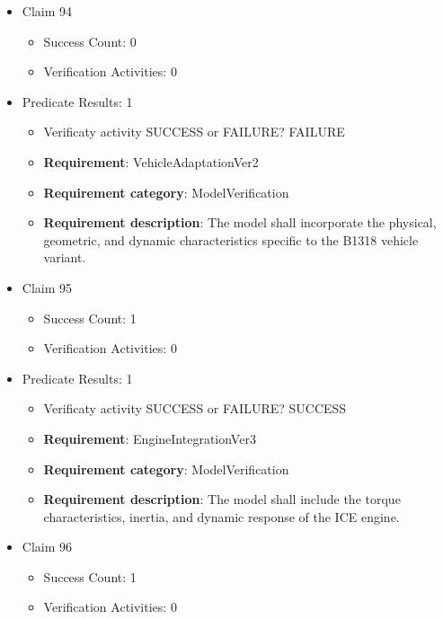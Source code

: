 \documentclass{article}
\begin{document}
\begin{itemize}
  				  \item Claim 94
				\begin{itemize}
			    	\item Success Count: 0 
			    	\item Verification Activities: 0
				\end{itemize}
				
									    
				\item Predicate Results: 1
					\begin{itemize}				
					\item Verificaty activity SUCCESS or FAILURE? FAILURE
					
					\item \textbf{Requirement}: VehicleAdaptationVer2 
					\item \textbf{Requirement category}: ModelVerification
					\item \textbf{Requirement description}: The model shall incorporate the physical, geometric, and dynamic characteristics specific to the B1318 vehicle variant.
					\end{itemize}

  				  \item Claim 95
				\begin{itemize}
			    	\item Success Count: 1 
			    	\item Verification Activities: 0
				\end{itemize}
				
									    
				\item Predicate Results: 1
					\begin{itemize}				
					\item Verificaty activity SUCCESS or FAILURE? SUCCESS
					
					\item \textbf{Requirement}: EngineIntegrationVer3 
					\item \textbf{Requirement category}: ModelVerification
					\item \textbf{Requirement description}: The model shall include the torque characteristics, inertia, and dynamic response of the ICE engine.
					\end{itemize}

  				  \item Claim 96
				\begin{itemize}
			    	\item Success Count: 1 
			    	\item Verification Activities: 0
				\end{itemize}
				

\end{itemize}
\end{document}

